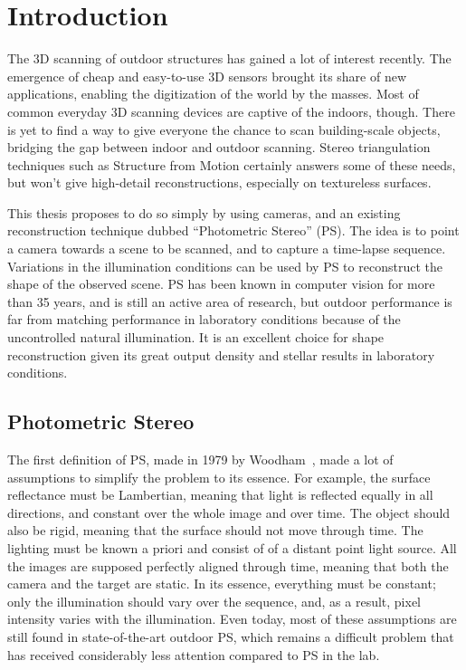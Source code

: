 
\chapter{Introduction}

The 3D scanning of outdoor structures has gained a lot of interest recently. The emergence of cheap and easy-to-use 3D sensors brought its share of new applications, enabling the digitization of the world by the masses. Most of common everyday 3D scanning devices are captive of the indoors, though. There is yet to find a way to give everyone the chance to scan building-scale objects, bridging the gap between indoor and outdoor scanning. Stereo triangulation techniques such as Structure from Motion certainly answers some of these needs, but won't give high-detail reconstructions, especially on textureless surfaces.

This thesis proposes to do so simply by using cameras, and an existing reconstruction technique dubbed ``Photometric Stereo'' (PS). The idea is to point a camera towards a scene to be scanned, and to capture a time-lapse sequence. Variations in the illumination conditions can be used by PS to reconstruct the shape of the observed scene. PS has been known in computer vision for more than 35 years, and is still an active area of research, but outdoor performance is far from matching performance in laboratory conditions because of the uncontrolled natural illumination. It is an excellent choice for shape reconstruction given its great output density and stellar results in laboratory conditions.

\section{Photometric Stereo}
\label{sec:ps_ori}

The first definition of PS, made in 1979 by Woodham~\cite{Woodham1979}, made a lot of assumptions to simplify the problem to its essence. For example, the surface reflectance must be Lambertian, meaning that light is reflected equally in all directions, and constant over the whole image and over time. The object should also be rigid, meaning that the surface should not move through time. The lighting must be known a priori and consist of of a distant point light source. All the images are supposed perfectly aligned through time, meaning that both the camera and the target are static. In its essence, everything must be constant; only the illumination should vary over the sequence, and, as a result, pixel intensity varies with the illumination. Even today, most of these assumptions are still found in state-of-the-art outdoor PS, which remains a difficult problem that has received considerably less attention compared to PS in the lab. 

